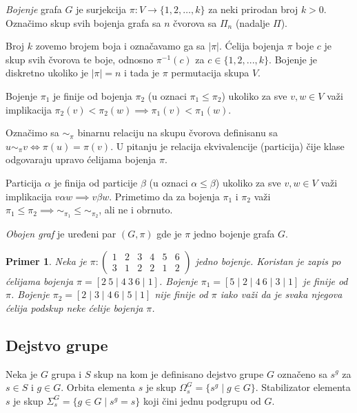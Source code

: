 \documentclass[12pt,oneside]{memoir}
\newtheorem{example}{Primer}
\theoremstyle{definition}
\begin{document}
   \emph{Bojenje} grafa $G$ je surjekcija $\pi : V \to \{1, 2, \dots, k\}$ za
   neki prirodan broj $k > 0$. Označimo skup svih bojenja grafa sa $n$ čvorova
   sa $\Pi_n$ (nadalje $\Pi$).

   Broj $k$ zovemo brojem boja i označavamo ga sa $|\pi|$.  Ćelija bojenja $\pi$
   boje $c$ je skup svih čvorova te boje, odnosno $\pi^{-1}(c)$ za $c \in \{1,
   2, ..., k\}$.  Bojenje je diskretno ukoliko je $|\pi| = n$ i tada je $\pi$
   permutacija skupa $V$.

   Bojenje $\pi_1$ je finije od bojenja $\pi_2$ (u oznaci $\pi_1 \leq \pi_2$)
   ukoliko za sve $v, w \in V$ važi implikacija $\pi_2(v) < \pi_2(w) \implies
   \pi_1(v) < \pi_1(w)$.

   Označimo sa $\sim_\pi$ binarnu relaciju na skupu čvorova definisanu sa $u
   \sim_\pi v \iff \pi(u) = \pi(v)$. U pitanju je relacija ekvivalencije
   (particija) čije klase odgovaraju upravo ćelijama bojenja $\pi$.

   Particija $\alpha$ je finija od particije $\beta$ (u oznaci $\alpha \leq
   \beta$) ukoliko za sve $v, w \in V$ važi implikacija $v \alpha w \implies v
   \beta w$. Primetimo da za bojenja $\pi_1$ i $\pi_2$ važi $\pi_1 \leq \pi_2
   \implies \sim_{\pi_1} \leq \sim_{\pi_2}$, ali ne i obrnuto.

   \emph{Obojen graf} je uređeni par $(G, \pi)$ gde je $\pi$ jedno bojenje
   grafa $G$.

   \begin{example}
	   Neka je $\pi :
	   \begin{pmatrix}
		   1 & 2 & 3 & 4 & 5 & 6 \\
		   3 & 1 & 2 & 2 & 1 & 2
	   \end{pmatrix}$
	   jedno bojenje. Koristan je zapis po ćelijama bojenja $\pi = [2\ 5 \mid
	   4\ 3\ 6 \mid 1]$. Bojenje $\pi_1 = [5 \mid 2 \mid 4\ 6 \mid 3 \mid 1]$
	   je finije od $\pi$. Bojenje $\pi_2 = [2 \mid 3 \mid 4\ 6 \mid 5 \mid 1]$
	   nije finije od $\pi$ iako važi da je svaka njegova ćelija podskup neke
	   ćelije bojenja $\pi$.
   \end{example}


   \subsection{Dejstvo grupe}

   Neka je $G$ grupa i $S$ skup na kom je definisano dejstvo grupe $G$ označeno
   sa $s^g$ za $s \in S$ i $g \in G$. Orbita elementa $s$ je skup $\Omega_s^G =
   \{s^g \mid g \in G\}$.  Stabilizator elementa $s$ je skup $\Sigma_s^G = \{g
   \in G \mid s^g=s\}$ koji čini jednu podgrupu od $G$.
\end{document}
